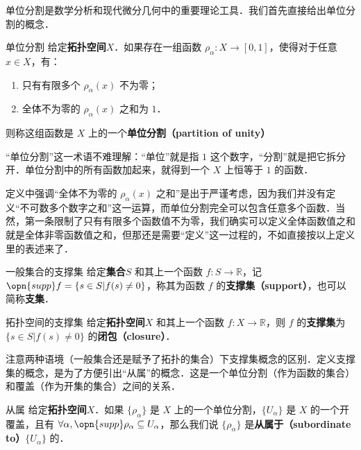 

单位分割是数学分析和现代微分几何中的重要理论工具．我们首先直接给出单位分割的概念．

\begin{definition}{单位分割}
给定\textbf{拓扑空间}$X$．如果存在一组函数 $\rho_\alpha: X \to [0, 1]$，使得对于任意 $x\in X$，有：
\begin{enumerate}
\item 只有有限多个 $\rho_\alpha(x)$ 不为零；
\item 全体不为零的 $\rho_\alpha(x)$ 之和为 $1$．
\end{enumerate}
则称这组函数是 $X$ 上的一个\textbf{单位分割（partition of unity）}
\end{definition}

“单位分割”这一术语不难理解：“单位”就是指 $1$ 这个数字，“分割”就是把它拆分开．单位分割中的所有函数加起来，就得到一个 $X$ 上恒等于 $1$ 的函数．

定义中强调“全体不为零的 $\rho_\alpha(x)$ 之和”是出于严谨考虑，因为我们并没有定义“不可数多个数字之和”这一运算，而单位分割完全可以包含任意多个函数．当然，第一条限制了只有有限多个函数值不为零，我们确实可以定义全体函数值之和就是全体非零函数值之和，但那还是需要“定义”这一过程的，不如直接按以上定义里的表述来了．

\begin{definition}{一般集合的支撑集}
给定\textbf{集合}$S$ 和其上一个函数 $f:S\to\mathbb{R}$，记 $\opn{supp} f = \{s\in S| f(s)\not=0\}$，称其为函数 $f$ 的\textbf{支撑集（support）}，也可以简称\textbf{支集}．
\end{definition}

\begin{definition}{拓扑空间的支撑集}
给定\textbf{拓扑空间}$X$ 和其上一个函数 $f:X\to\mathbb{R}$，则 $f$ 的\textbf{支撑集}为 $\{s\in S| f(s)\not=0\}$ 的\textbf{闭包（closure）}．
\end{definition}

注意两种语境（一般集合还是赋予了拓扑的集合）下支撑集概念的区别．定义支撑集的概念，是为了方便引出“从属”的概念．这是一个单位分割（作为函数的集合）和覆盖（作为开集的集合）之间的关系．

\begin{definition}{从属}
给定\textbf{拓扑空间}$X$．如果 $\{\rho_\alpha\}$ 是 $X$ 上的一个单位分割，$\{U_\alpha\}$ 是 $X$ 的一个开覆盖，且有 $\forall \alpha, \opn{supp}\rho_\alpha\subseteq U_\alpha$，那么我们说 $\{\rho_\alpha\}$ 是\textbf{从属于（subordinate to）}$\{U_\alpha\}$ 的．
\end{definition}

